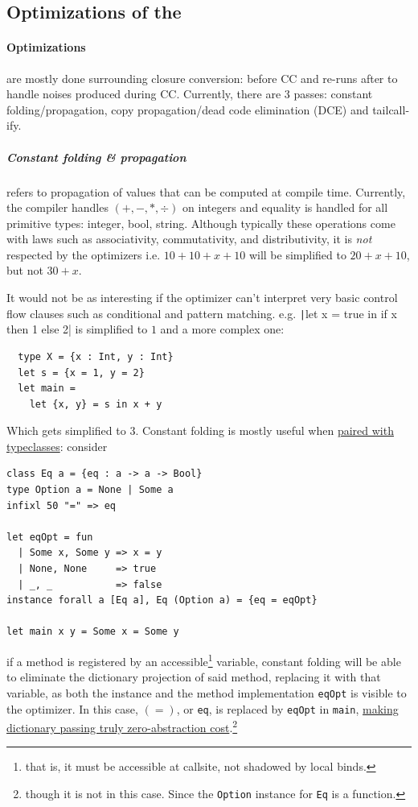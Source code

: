 \documentclass[a4paper, 11pt]{article}
\theoremstyle{remark}\newtheorem*{remark}{Remark}
\theoremstyle{definition}\newtheorem*{definition}{Definition}
\begin{document}
\subsection{Optimizations of the \Lambdair}

\paragraph{Optimizations} are mostly done surrounding closure conversion: before CC and re-runs
after to handle noises produced during CC. Currently, there are 3 passes: constant folding/propagation,
copy propagation/dead code elimination (DCE) and tailcall-ify.

\subparagraph{Constant folding \& propagation}
refers to propagation of values that can be computed at compile time.
Currently, the compiler handles $(+,-,*,\div)$ on integers and equality is handled for all primitive types: integer, bool, string.
Although typically these operations come with laws such as associativity, commutativity, and distributivity,
it is \emph{not} respected by the optimizers i.e. $10 + 10 + x + 10$
will be simplified to $20 + x + 10$, but not $30 + x$.

It would not be as interesting if the optimizer can't interpret very basic control flow clauses such as
conditional and pattern matching. e.g. \texttt|let x = true in if x then 1 else 2| is simplified to $1$ and a more complex one:
\begin{verbatim}
  type X = {x : Int, y : Int}
  let s = {x = 1, y = 2}
  let main =
    let {x, y} = s in x + y
\end{verbatim}

Which gets simplified to $3$.
Constant folding is mostly useful when \underline{paired with typeclasses}: consider
\begin{verbatim}
class Eq a = {eq : a -> a -> Bool}
type Option a = None | Some a
infixl 50 "=" => eq

let eqOpt = fun
  | Some x, Some y => x = y
  | None, None     => true
  | _, _           => false
instance forall a [Eq a], Eq (Option a) = {eq = eqOpt}

let main x y = Some x = Some y
\end{verbatim}

if a method is registered by an accessible\footnote{
that is, it must be accessible at callsite, not shadowed by local binds.
}
variable,
constant folding will be able to eliminate the dictionary
projection of said method, replacing it with that variable,
as both the instance and the method implementation \texttt{eqOpt} is visible to the optimizer.
In this case, $(=)$, or \texttt{eq}, is
replaced by \texttt{eqOpt} in \texttt{main}, \underline{making dictionary passing truly zero-abstraction cost}.\footnote{
though it is not in this case. Since the \texttt{Option} instance for \texttt{Eq} is a function.
}
\end{document}
